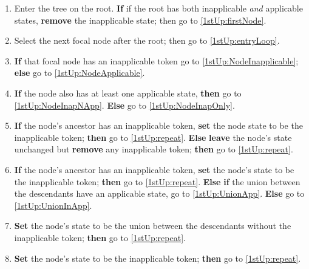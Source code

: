\documentclass[a4paper,12pt]{article}
\begin{document}
\begin{enumerate}
    \item Enter the tree on the root. \textbf{If} if the root has both inapplicable \textit{and} applicable states, \textbf{remove} the inapplicable state; then go to \ref{1stUp:firstNode}.
    \item \label{1stUp:firstNode} Select the next focal node after the root; then go to \ref{1stUp:entryLoop}. 
    \item \label{1stUp:entryLoop} \textbf{If} that focal node has an inapplicable token go to \ref{1stUp:NodeInapplicable}; \textbf{else} go to \ref{1stUp:NodeApplicable}.
    \item \label{1stUp:NodeInapplicable} \textbf{If} the node also has at least one applicable state, \textbf{then} go to \ref{1stUp:NodeInapNApp}. \textbf{Else} go to \ref{1stUp:NodeInapOnly}.
    \item \label{1stUp:NodeInapNApp} \textbf{If} the node's ancestor has an inapplicable token, \textbf{set} the node state to be the inapplicable token; \textbf{then} go to \ref{1stUp:repeat}. \textbf{Else} \textbf{leave} the node's state unchanged but \textbf{remove} any inapplicable token; \textbf{then} go to \ref{1stUp:repeat}.
    \item \label{1stUp:NodeInapOnly} \textbf{If} the node's ancestor has an inapplicable token, \textbf{set} the node's state to be the inapplicable token; \textbf{then} go to \ref{1stUp:repeat}. \textbf{Else} \textbf{if} the union between the descendants have an applicable state, go to \ref{1stUp:UnionApp}. \textbf{Else} go to \ref{1stUp:UnionInApp}.
    \item \label{1stUp:UnionApp} \textbf{Set} the node's state to be the union between the descendants without the inapplicable token; \textbf{then} go to \ref{1stUp:repeat}.
    \item \label{1stUp:UnionInApp} \textbf{Set} the node's state to be the inapplicable token; \textbf{then} go to \ref{1stUp:repeat}.

\end{enumerate}
\end{document}
